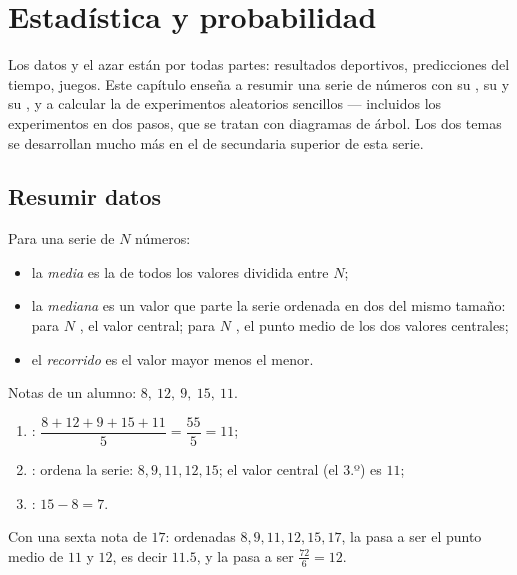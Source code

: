 \chapter{Estadística y probabilidad}\label{ch:g9:statproba}

Los datos y el azar están por todas partes: resultados deportivos, predicciones del tiempo,
juegos. Este capítulo enseña a resumir una serie de números con su
, su  y su , y a calcular la  de experimentos
aleatorios sencillos --- incluidos los experimentos en dos pasos, que se tratan con diagramas
de árbol. Los dos temas se desarrollan mucho más en el  de
secundaria superior de esta serie.

\section{Resumir datos}

\begin{definition}\label{def:g9:statproba:indicators}
Para una serie de $N$ números:
\begin{itemize}
  \item la \emph{media} es la  de todos los valores dividida
        entre $N$;
  \item la \emph{mediana} es un valor que parte la serie ordenada
        en dos  del mismo tamaño: para $N$ , el valor
        central; para $N$ , el punto medio de los dos valores centrales;
  \item el \emph{recorrido} es el valor mayor menos el
        menor.
\end{itemize}
\end{definition}

\begin{example}\label{ex:g9:statproba:indicators}
Notas de un alumno: $8,\ 12,\ 9,\ 15,\ 11$.
\begin{enumerate}
  \item {}: $\dfrac{8 + 12 + 9 + 15 + 11}{5} = \dfrac{55}{5} = 11$;
  \item {}: ordena la serie: $8, 9, 11, 12, 15$; el valor central
        (el 3.º) es $11$;
  \item {}: $15 - 8 = 7$.
\end{enumerate}
Con una sexta nota de $17$: ordenadas $8, 9, 11, 12, 15, 17$, la 
pasa a ser el punto medio de $11$ y $12$, es decir $11.5$, y la 
pasa a ser $\frac{72}{6} = 12$.
\end{example}

